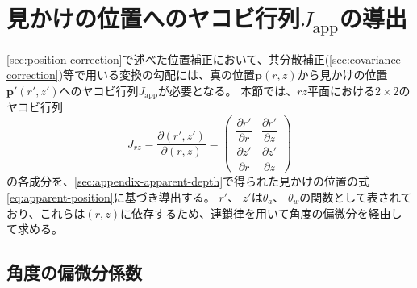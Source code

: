 \newpage
\section{見かけの位置へのヤコビ行列$J_{\mathrm{app}}$の導出}\label{sec:appendix-jacobian}

\cref{sec:position-correction}で述べた位置補正において、共分散補正(\cref{sec:covariance-correction})等で用いる変換の勾配には、真の位置$\bm{p}(r,z)$から見かけの位置$\bm{p}'(r',z')$へのヤコビ行列$J_{\mathrm{app}}$が必要となる。
本節では、$rz$平面における$2 \times 2$のヤコビ行列
\begin{equation}\label{eq:Jacobian-def-rz}
  J_{rz} = \frac{\partial (r', z')}{\partial (r, z)} = \begin{pmatrix} \dfrac{\partial r'}{\partial r} & \dfrac{\partial r'}{\partial z} \\[1em] \dfrac{\partial z'}{\partial r} & \dfrac{\partial z'}{\partial z} \end{pmatrix}
\end{equation}
の各成分を、\cref{sec:appendix-apparent-depth}で得られた見かけの位置の式\eqref{eq:apparent-position}に基づき導出する。
$r'$、 $z'$は$\theta_a$、 $\theta_w$の関数として表されており、これらは$(r,z)$に依存するため、連鎖律を用いて角度の偏微分を経由して求める。

\subsection{角度の偏微分係数}

